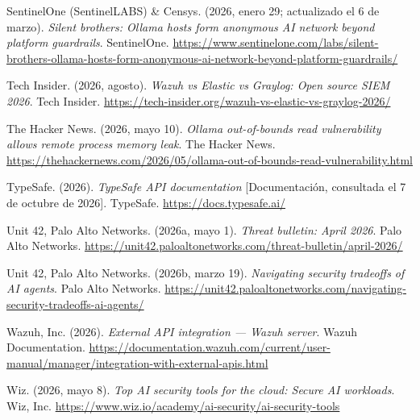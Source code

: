 \documentclass[11pt,letterpaper]{article}
\newcommand{\refapa}[1]{%
  \par\noindent\hangindent=1.25cm\hangafter=1 #1\par\vspace{0.5em}%
}
\begin{document}
{\hypertarget{sentinelone2026}{}\refapa{SentinelOne (SentinelLABS) \& Censys. (2026, enero 29; actualizado el 6 de marzo). \emph{Silent brothers: Ollama hosts form anonymous AI network beyond platform guardrails}. SentinelOne. \url{https://www.sentinelone.com/labs/silent-brothers-ollama-hosts-form-anonymous-ai-network-beyond-platform-guardrails/}}

\hypertarget{techinsider2026}{}\refapa{Tech Insider. (2026, agosto). \emph{Wazuh vs Elastic vs Graylog: Open source SIEM 2026}. Tech Insider. \url{https://tech-insider.org/wazuh-vs-elastic-vs-graylog-2026/}}

\hypertarget{thn2026}{}\refapa{The Hacker News. (2026, mayo 10). \emph{Ollama out-of-bounds read vulnerability allows remote process memory leak}. The Hacker News. \url{https://thehackernews.com/2026/05/ollama-out-of-bounds-read-vulnerability.html}}

\hypertarget{typesafe2026}{}\refapa{TypeSafe. (2026). \emph{TypeSafe API documentation} [Documentación, consultada el 7 de octubre de 2026]. TypeSafe. \url{https://docs.typesafe.ai/}}

\hypertarget{unit42a2026}{}\refapa{Unit 42, Palo Alto Networks. (2026a, mayo 1). \emph{Threat bulletin: April 2026}. Palo Alto Networks. \url{https://unit42.paloaltonetworks.com/threat-bulletin/april-2026/}}

\hypertarget{unit42b2026}{}\refapa{Unit 42, Palo Alto Networks. (2026b, marzo 19). \emph{Navigating security tradeoffs of AI agents}. Palo Alto Networks. \url{https://unit42.paloaltonetworks.com/navigating-security-tradeoffs-ai-agents/}}

\hypertarget{wazuhdocs2026}{}\refapa{Wazuh, Inc. (2026). \emph{External API integration --- Wazuh server}. Wazuh Documentation. \url{https://documentation.wazuh.com/current/user-manual/manager/integration-with-external-apis.html}}

\hypertarget{wiz2026}{}\refapa{Wiz. (2026, mayo 8). \emph{Top AI security tools for the cloud: Secure AI workloads}. Wiz, Inc. \url{https://www.wiz.io/academy/ai-security/ai-security-tools}}

}
\end{document}

